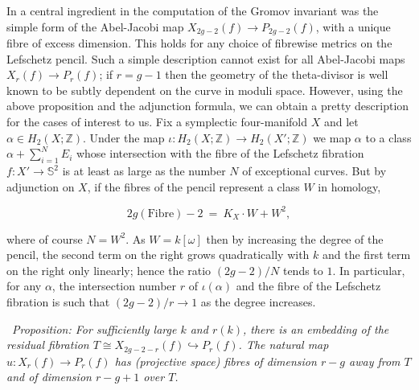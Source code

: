 \documentclass[10pt]{article}
\newcommand{\zz}{\mathbb{Z}}
\newcommand{\sss}{\mathbb{S}}
\newcounter{Universal}[section]
\renewcommand{\theUniversal}{\thesection.\arabic{Universal}}
\newenvironment{Italic}{\refstepcounter{Universal} \par \vspace{0.5cm}
\noindent {\bf (\theUniversal)}\ \it}{\par \vspace{0.5cm}}
\newenvironment{Prop}{\begin{Italic}{\sc Proposition:} }{\end{Italic}}
\begin{document}
\noindent In \cite{SKDIS} a
central ingredient in the computation of the Gromov invariant was the
simple form of the Abel-Jacobi map $X_{2g-2}(f) \rightarrow
P_{2g-2}(f)$, with a unique fibre of excess dimension.  This holds for
any choice of fibrewise metrics on the Lefschetz pencil.  Such a simple
description cannot exist for all Abel-Jacobi maps $X_r(f) \rightarrow
P_r(f)$; if $r=g-1$ then the geometry of the theta-divisor is well
known to be subtly dependent on the curve in moduli space.  However, using the
above proposition and the adjunction formula, we can obtain a pretty
description for the cases of interest to us.  Fix a symplectic
four-manifold $X$ and let $\alpha \in H_2(X;\zz)$.  Under the map
$\iota: H_2(X; \zz) \rightarrow H_2(X'; \zz)$ we map $\alpha$ to a
class $\alpha + \sum_{i=1}^N E_i$ whose intersection with the fibre of the
Lefschetz fibration $f: X' \rightarrow \sss^2$ is at least as large as
the number $N$ of exceptional curves.  But by adjunction on $X$, if the
fibres of the pencil represent a class $W$ in homology,

$$2g(\mathrm{Fibre}) - 2 \ = \ K_{X} \cdot W + W^2,$$

\noindent where of course $N = W^2$.  As $W = k[\omega]$ then by
increasing the degree of the 
pencil, the second term on the right grows quadratically with $k$ and
the first term on the right only linearly; hence the ratio $(2g-2) / N$
tends to $1$. In particular, for any $\alpha$, the intersection number
$r$ of $\iota(\alpha)$ and the fibre of the Lefschetz fibration
is such that $(2g-2)/r \rightarrow 1$ as the degree increases.

\begin{Prop} \label{nicefibres}
For sufficiently large $k$ and $r(k)$, there is an embedding of the
residual fibration $T \cong X_{2g-2-r}(f) \hookrightarrow P_r(f)$.  The
natural map  $u:X_r(f) \rightarrow P_r(f)$ has (projective space) fibres
of dimension $r-g$ away from $T$ and of dimension $r-g+1$ over $T$.
\end{Prop}
\end{document}
